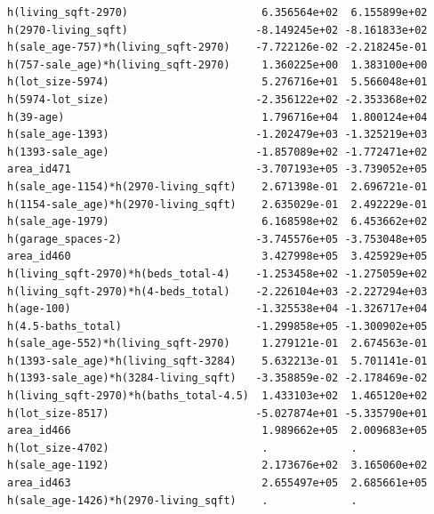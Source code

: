 \documentclass[
]{article}
\begin{document}
\begin{verbatim}
h(living_sqft-2970)                     6.356564e+02  6.155899e+02
h(2970-living_sqft)                    -8.149245e+02 -8.161833e+02
h(sale_age-757)*h(living_sqft-2970)    -7.722126e-02 -2.218245e-01
h(757-sale_age)*h(living_sqft-2970)     1.360225e+00  1.383100e+00
h(lot_size-5974)                        5.276716e+01  5.566048e+01
h(5974-lot_size)                       -2.356122e+02 -2.353368e+02
h(39-age)                               1.796716e+04  1.800124e+04
h(sale_age-1393)                       -1.202479e+03 -1.325219e+03
h(1393-sale_age)                       -1.857089e+02 -1.772471e+02
area_id471                             -3.707193e+05 -3.739052e+05
h(sale_age-1154)*h(2970-living_sqft)    2.671398e-01  2.696721e-01
h(1154-sale_age)*h(2970-living_sqft)    2.635029e-01  2.492229e-01
h(sale_age-1979)                        6.168598e+02  6.453662e+02
h(garage_spaces-2)                     -3.745576e+05 -3.753048e+05
area_id460                              3.427998e+05  3.425929e+05
h(living_sqft-2970)*h(beds_total-4)    -1.253458e+02 -1.275059e+02
h(living_sqft-2970)*h(4-beds_total)    -2.226104e+03 -2.227294e+03
h(age-100)                             -1.325538e+04 -1.326717e+04
h(4.5-baths_total)                     -1.299858e+05 -1.300902e+05
h(sale_age-552)*h(living_sqft-2970)     1.279121e-01  2.674563e-01
h(1393-sale_age)*h(living_sqft-3284)    5.632213e-01  5.701141e-01
h(1393-sale_age)*h(3284-living_sqft)   -3.358859e-02 -2.178469e-02
h(living_sqft-2970)*h(baths_total-4.5)  1.433103e+02  1.465120e+02
h(lot_size-8517)                       -5.027874e+01 -5.335790e+01
area_id466                              1.989662e+05  2.009683e+05
h(lot_size-4702)                        .             .           
h(sale_age-1192)                        2.173676e+02  3.165060e+02
area_id463                              2.655497e+05  2.685661e+05
h(sale_age-1426)*h(2970-living_sqft)    .             .           
                                                                  

\end{verbatim}
\end{document}
